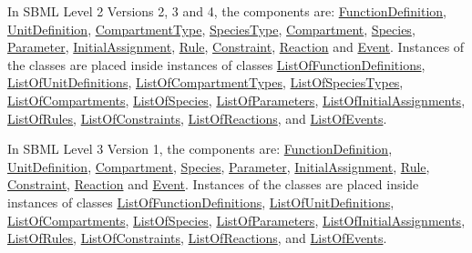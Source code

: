 \begin{DoxyItemize}
\item In S\+B\+ML Level 2 Versions 2, 3 and 4, the components are\+: \hyperlink{class_function_definition}{Function\+Definition}, \hyperlink{class_unit_definition}{Unit\+Definition}, \hyperlink{class_compartment_type}{Compartment\+Type}, \hyperlink{class_species_type}{Species\+Type}, \hyperlink{class_compartment}{Compartment}, \hyperlink{class_species}{Species}, \hyperlink{class_parameter}{Parameter}, \hyperlink{class_initial_assignment}{Initial\+Assignment}, \hyperlink{class_rule}{Rule}, \hyperlink{class_constraint}{Constraint}, \hyperlink{class_reaction}{Reaction} and \hyperlink{class_event}{Event}. Instances of the classes are placed inside instances of classes \hyperlink{class_list_of_function_definitions}{List\+Of\+Function\+Definitions}, \hyperlink{class_list_of_unit_definitions}{List\+Of\+Unit\+Definitions}, \hyperlink{class_list_of_compartment_types}{List\+Of\+Compartment\+Types}, \hyperlink{class_list_of_species_types}{List\+Of\+Species\+Types}, \hyperlink{class_list_of_compartments}{List\+Of\+Compartments}, \hyperlink{class_list_of_species}{List\+Of\+Species}, \hyperlink{class_list_of_parameters}{List\+Of\+Parameters}, \hyperlink{class_list_of_initial_assignments}{List\+Of\+Initial\+Assignments}, \hyperlink{class_list_of_rules}{List\+Of\+Rules}, \hyperlink{class_list_of_constraints}{List\+Of\+Constraints}, \hyperlink{class_list_of_reactions}{List\+Of\+Reactions}, and \hyperlink{class_list_of_events}{List\+Of\+Events}.


\item In S\+B\+ML Level 3 Version 1, the components are\+: \hyperlink{class_function_definition}{Function\+Definition}, \hyperlink{class_unit_definition}{Unit\+Definition}, \hyperlink{class_compartment}{Compartment}, \hyperlink{class_species}{Species}, \hyperlink{class_parameter}{Parameter}, \hyperlink{class_initial_assignment}{Initial\+Assignment}, \hyperlink{class_rule}{Rule}, \hyperlink{class_constraint}{Constraint}, \hyperlink{class_reaction}{Reaction} and \hyperlink{class_event}{Event}. Instances of the classes are placed inside instances of classes \hyperlink{class_list_of_function_definitions}{List\+Of\+Function\+Definitions}, \hyperlink{class_list_of_unit_definitions}{List\+Of\+Unit\+Definitions}, \hyperlink{class_list_of_compartments}{List\+Of\+Compartments}, \hyperlink{class_list_of_species}{List\+Of\+Species}, \hyperlink{class_list_of_parameters}{List\+Of\+Parameters}, \hyperlink{class_list_of_initial_assignments}{List\+Of\+Initial\+Assignments}, \hyperlink{class_list_of_rules}{List\+Of\+Rules}, \hyperlink{class_list_of_constraints}{List\+Of\+Constraints}, \hyperlink{class_list_of_reactions}{List\+Of\+Reactions}, and \hyperlink{class_list_of_events}{List\+Of\+Events}. 
\end{DoxyItemize}

